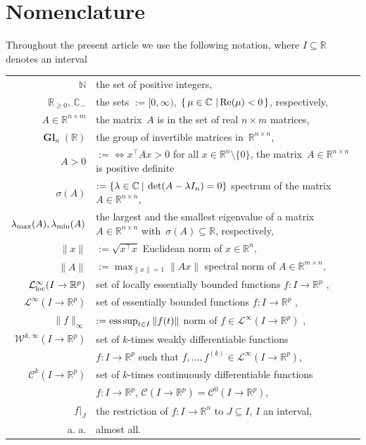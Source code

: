 \documentclass[ envcountsect, envcountsame]{svjour3}
\newcommand{\setdef}[2]{\left\{\, #1\, \left|\, \vphantom{#1} #2 \right.\right\}}
\newcommand{\R}{\mathbb{R}}
\newcommand{\C}{\mathbb{C}}
\newcommand{\N}{\mathbb{N}}
\newcommand{\cC}{\mathcal{C}}
\newcommand{\cL}{\mathcal{L}}
\newcommand{\cW}{\mathcal{W}}
\newcommand{\rp}{\mathbb{R}_{\geq 0}}
\DeclareMathOperator{\Gl}{\mathbf{Gl}}
\DeclareMathOperator{\esssup}{\rm ess\,sup}
\begin{document}
\section*{Nomenclature}
Throughout the present article we use the following notation, where $I \subseteq \R$ denotes an interval
\ \\
\begin{tabularx}{\textwidth}{rX}
$\N$& the set of positive integers, \\
$\rp$, $\C_-$ & the sets $:= [0, \infty)$, $\setdef{ \mu \in \C}{ \text{Re}(\mu) < 0}$, respectively, \\
$A \in \R^{n \times m}$ & the matrix~$A$ is in the set of real $n \times m$ matrices, \\
$\Gl_n(\R)$ & the group of invertible matrices in~$\R^{n \times n}$,  \\
$A > 0$ &$:= \iff x^\top A x > 0$ for all $x \in \R^n \setminus\{0\}$, the matrix~$A \in \R^{n \times n}$ is positive definite \\
$\sigma(A)$ & $:= \{\lambda \in \C \ \vline \ \det(A-\lambda I_n)=0 \}$ spectrum of the matrix $A \in \R^{n \times n}$, \\
$\lambda_{\rm max}(A), \lambda_{\rm min}(A) $ & the largest and the smallest eigenvalue of a matrix $A \in \R^{n \times n}$ with~$\sigma(A) \subseteq \R$, respectively, \\
$\| x \| $ & $:=\sqrt{x^\top x} $ Euclidean norm of  $x \in \R^n$,  \\
$\| A \|$ & $:= \max_{\|x\|=1} \|Ax\|$ spectral norm of $A \in \R^{m \times n}$, \\
$\cL_{\rm loc}^\infty (I \to \R^p)$ & set of locally essentially bounded functions $ f: I \to \R^p$ ,  \\
$\cL^\infty (I \to \R^p)$ & set of essentially bounded functions $ f: I \to \R^p$ ,  \\
$\| f \|_{\infty} $ & $:= \esssup_{t \in I} \|f(t)\| $ norm of $f \in \cL^\infty(I \to \R^p)$ , \\
$\cW^{k,\infty}(I \to \R^p)$ & set of $k$-times weakly differentiable functions\\& $ f : I \to \R^p$ such that $f,\ldots,f^{(k)} \in \cL^\infty(I \to \R^p)$, \\
$\cC^k( I \to \R^p) $ & set of $k$-times continuously differentiable functions \\& $f : I \to \R^p$, $\cC(I\to \R^p) = \cC^0(I\to \R^p)$, \\
$f|_{J}$ & the restriction of $f : I \to \R^n$ to $J \subseteq I$, $I$ an interval, \\
a. a. & almost all.
\end{tabularx}
\end{document}

